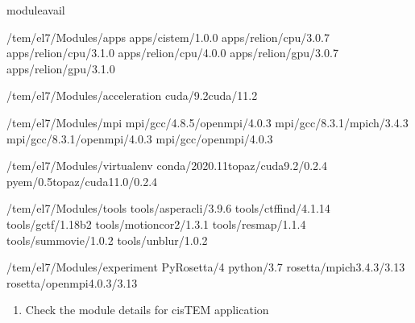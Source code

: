 \documentclass[a4paper,10pt,english]{sphinxmanual}
\begin{document}
\begin{sphinxVerbatim}[commandchars=\\\{\}]
\PYGZdl{}\PYGZgt{}moduleavail

\PYGZhy{}\PYGZhy{}\PYGZhy{}\PYGZhy{}\PYGZhy{}\PYGZhy{}\PYGZhy{}\PYGZhy{}/tem/el7/Modules/apps\PYGZhy{}\PYGZhy{}\PYGZhy{}\PYGZhy{}\PYGZhy{}\PYGZhy{}\PYGZhy{}\PYGZhy{}
apps/cistem/1.0.0
apps/relion/cpu/3.0.7
apps/relion/cpu/3.1.0
apps/relion/cpu/4.0.0
apps/relion/gpu/3.0.7
apps/relion/gpu/3.1.0

\PYGZhy{}\PYGZhy{}\PYGZhy{}\PYGZhy{}/tem/el7/Modules/acceleration\PYGZhy{}\PYGZhy{}\PYGZhy{}\PYGZhy{}
cuda/9.2cuda/11.2

\PYGZhy{}\PYGZhy{}\PYGZhy{}\PYGZhy{}\PYGZhy{}\PYGZhy{}\PYGZhy{}\PYGZhy{}/tem/el7/Modules/mpi\PYGZhy{}\PYGZhy{}\PYGZhy{}\PYGZhy{}\PYGZhy{}\PYGZhy{}\PYGZhy{}\PYGZhy{}\PYGZhy{}
mpi/gcc/4.8.5/openmpi/4.0.3
mpi/gcc/8.3.1/mpich/3.4.3
mpi/gcc/8.3.1/openmpi/4.0.3
mpi/gcc/openmpi/4.0.3

\PYGZhy{}\PYGZhy{}\PYGZhy{}\PYGZhy{}\PYGZhy{}/tem/el7/Modules/virtualenv\PYGZhy{}\PYGZhy{}\PYGZhy{}\PYGZhy{}\PYGZhy{}
conda/2020.11topaz/cuda\PYGZhy{}9.2/0.2.4
pyem/0.5topaz/cuda\PYGZhy{}11.0/0.2.4

\PYGZhy{}\PYGZhy{}\PYGZhy{}\PYGZhy{}\PYGZhy{}\PYGZhy{}\PYGZhy{}/tem/el7/Modules/tools\PYGZhy{}\PYGZhy{}\PYGZhy{}\PYGZhy{}\PYGZhy{}\PYGZhy{}\PYGZhy{}\PYGZhy{}
tools/aspera\PYGZhy{}cli/3.9.6
tools/ctffind/4.1.14
tools/gctf/1.18\PYGZus{}b2
tools/motioncor2/1.3.1
tools/resmap/1.1.4
tools/summovie/1.0.2
tools/unblur/1.0.2

\PYGZhy{}\PYGZhy{}\PYGZhy{}\PYGZhy{}\PYGZhy{}/tem/el7/Modules/experiment\PYGZhy{}\PYGZhy{}\PYGZhy{}\PYGZhy{}\PYGZhy{}
PyRosetta/4
python/3.7
rosetta/mpich\PYGZhy{}3.4.3/3.13
rosetta/openmpi\PYGZhy{}4.0.3/3.13
\end{sphinxVerbatim}
\begin{enumerate}
%
\setcounter{enumi}{1}
\item {} 
\sphinxAtStartPar
Check the module details for cisTEM application

\end{enumerate}
\end{document}
